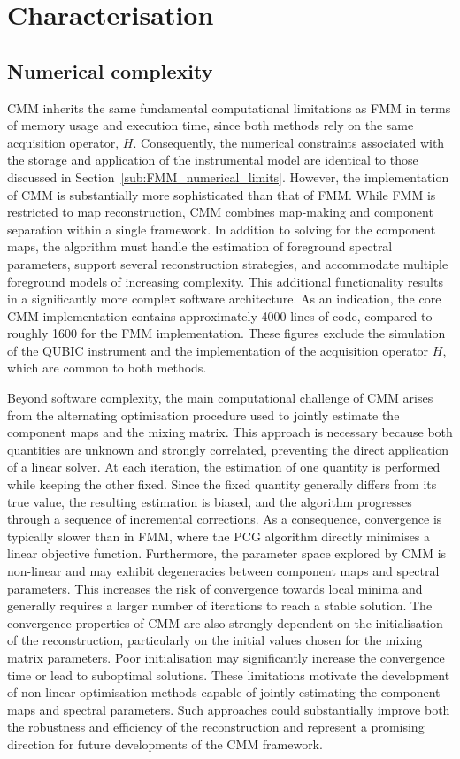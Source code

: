 \documentclass[../../thesis.tex]{subfiles}
\begin{document}
\section{Characterisation}

\subsection{Numerical complexity}

CMM inherits the same fundamental computational limitations as FMM in terms of memory usage and execution time, since both methods rely on the same acquisition operator, $H$. Consequently, the numerical constraints associated with the storage and application of the instrumental model are identical to those discussed in Section~\ref{sub:FMM_numerical_limits}.
However, the implementation of CMM is substantially more sophisticated than that of FMM. While FMM is restricted to map reconstruction, CMM combines map-making and component separation within a single framework. In addition to solving for the component maps, the algorithm must handle the estimation of foreground spectral parameters, support several reconstruction strategies, and accommodate multiple foreground models of increasing complexity.
This additional functionality results in a significantly more complex software architecture. As an indication, the core CMM implementation contains approximately 4000 lines of code, compared to roughly 1600 for the FMM implementation. These figures exclude the simulation of the QUBIC instrument and the implementation of the acquisition operator $H$, which are common to both methods.

Beyond software complexity, the main computational challenge of CMM arises from the alternating optimisation procedure used to jointly estimate the component maps and the mixing matrix. This approach is necessary because both quantities are unknown and strongly correlated, preventing the direct application of a linear solver. At each iteration, the estimation of one quantity is performed while keeping the other fixed. Since the fixed quantity generally differs from its true value, the resulting estimation is biased, and the algorithm progresses through a sequence of incremental corrections.
As a consequence, convergence is typically slower than in FMM, where the PCG algorithm directly minimises a linear objective function. Furthermore, the parameter space explored by CMM is non-linear and may exhibit degeneracies between component maps and spectral parameters. This increases the risk of convergence towards local minima and generally requires a larger number of iterations to reach a stable solution.
The convergence properties of CMM are also strongly dependent on the initialisation of the reconstruction, particularly on the initial values chosen for the mixing matrix parameters. Poor initialisation may significantly increase the convergence time or lead to suboptimal solutions.
These limitations motivate the development of non-linear optimisation methods capable of jointly estimating the component maps and spectral parameters. Such approaches could substantially improve both the robustness and efficiency of the reconstruction and represent a promising direction for future developments of the CMM framework.
\end{document}

